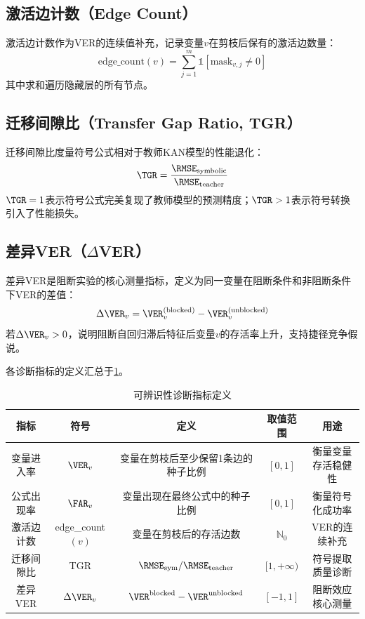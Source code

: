\subsection{激活边计数（Edge Count）}

激活边计数作为VER的连续值补充，记录变量$v$在剪枝后保有的激活边数量：
\begin{equation}
\text{edge\_count}(v) = \sum_{j=1}^{m} \mathbb{1}\left[\text{mask}_{v,j} \neq 0\right]
\end{equation}
其中求和遍历隐藏层的所有节点。

\subsection{迁移间隙比（Transfer Gap Ratio, TGR）}

迁移间隙比度量符号公式相对于教师KAN模型的性能退化：
\begin{equation}
\TGR = \frac{\RMSE_{\text{symbolic}}}{\RMSE_{\text{teacher}}}
\end{equation}
$\TGR = 1$表示符号公式完美复现了教师模型的预测精度；$\TGR > 1$表示符号转换引入了性能损失。

\subsection{差异VER（$\Delta$VER）}

差异VER是阻断实验的核心测量指标，定义为同一变量在阻断条件和非阻断条件下VER的差值：
\begin{equation}
\Delta\VER_v = \VER_v^{(\text{blocked})} - \VER_v^{(\text{unblocked})}
\end{equation}
若$\Delta\VER_v > 0$，说明阻断自回归滞后特征后变量$v$的存活率上升，支持捷径竞争假说。

各诊断指标的定义汇总于\cref{tab:metrics}。

\begin{table}[htbp]
\centering
\caption{可辨识性诊断指标定义}
\label{tab:metrics}
\begin{tabular}{ccccc}
\toprule
指标 & 符号 & 定义 & 取值范围 & 用途 \\
\midrule
变量进入率 & $\VER_v$ & 变量在剪枝后至少保留1条边的种子比例 & $[0, 1]$ & 衡量变量存活稳健性 \\
公式出现率 & $\FAR_v$ & 变量出现在最终公式中的种子比例 & $[0, 1]$ & 衡量符号化成功率 \\
激活边计数 & edge\_count$(v)$ & 变量在剪枝后的存活边数 & $\mathbb{N}_0$ & VER的连续补充 \\
迁移间隙比 & TGR & $\RMSE_{\text{sym}} / \RMSE_{\text{teacher}}$ & $[1, +\infty)$ & 符号提取质量诊断 \\
差异VER & $\Delta\VER_v$ & $\VER^{\text{blocked}} - \VER^{\text{unblocked}}$ & $[-1, 1]$ & 阻断效应核心测量 \\
\bottomrule
\end{tabular}
\end{table}

